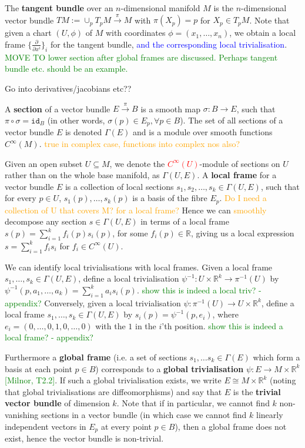 \documentclass[a4paper]{article}
\theoremstyle{definition} \newtheorem*{definition}{Definition}
\theoremstyle{definition} \newtheorem*{definitions}{Definitions}
\theoremstyle{plain} \newtheorem{theorem}{Theorem}[section]
\theoremstyle{plain} \newtheorem{proposition}[theorem]{Proposition}
\theoremstyle{plain} \newtheorem{corollary}[theorem]{Corollary}
\theoremstyle{plain} \newtheorem{lemma}[theorem]{Lemma}
\theoremstyle{plain} \newtheorem{example}[theorem]{Example}
\newcommand{\checkCorrect}[1]{\textcolor{red}{#1}}
\newcommand{\understandBetter}[1]{\textcolor{orange}{#1}}
\newcommand{\question}[1]{\textcolor{orange}{#1}}
\newcommand{\explainFurther}[1]{\textcolor{blue}{#1}}
\newcommand{\finish}[1]{\textcolor{green}{#1}}
\newcommand{\defn}[1]{\textbf{#1}}
\newcommand{\realnos}{\mathbb{R}}
\newcommand{\id}{\mathtt{id}}
\begin{document}
The \defn{tangent bundle} over an $n$-dimensional manifold $M$ is the $n$-dimensional vector bundle $TM:=\cup_p T_p M\xrightarrow{\pi} M$ with $\pi(X_p)=p$ for $X_p\in T_p M$. Note that given a chart $(U, \phi)$ of $M$ with coordinates $\phi =(x_1, \ldots, x_n)$, we obtain a local frame $\{\frac{\partial}{\partial{x^i}}\}_i$ for the tangent bundle, \explainFurther{and the corresponding local trivialisation}. \finish{MOVE TO lower section after global frames are discussed. Perhaps tangent bundle etc. should be an example.}



Go into derivatives/jacobians etc??

A \defn{section} of a vector bundle $E\xrightarrow{\pi} B$ is a smooth map $\sigma:B\rightarrow E$, such that $\pi \circ \sigma=\id_B$ (in other words, $\sigma(p)\in E_p, \forall p\in B$). The set of all sections of a vector bundle $E$ is denoted $\Gamma (E)$ and is a module over smooth functions $C^\infty(M)$. \question{true in complex case, functions into complex nos also?}

Given an open subset $U\subseteq M$, we denote the \checkCorrect{$C^\infty (U)$}-module of sections on $U$ rather than on the whole base manifold, as $\Gamma (U, E)$. A \defn{local frame} for a vector bundle $E$ is a collection of local sections $s_1, s_2, \ldots, s_k\in \Gamma (U, E)$, such that for every $p\in U$, $s_1(p),\ldots, s_k(p)$ is a basis of the fibre $E_p$. \question{Do I need a collection of U that covers M? for a local frame?} Hence we can \understandBetter{smoothly} decompose any section $s\in \Gamma(U, E)$ in terms of a local frame $s(p)=\sum_{i=1}^k f_i(p)s_i(p)$, for some $f_i(p)\in \realnos$, giving us a local expression $s=\sum_{i=1}^k f_i s_i$ for $f_i\in C^\infty(U)$. 

We can identify local trivialisations with local frames. Given a local frame $s_1, \ldots, s_k\in \Gamma(U, E)$, define a local trivialisation $\psi^{-1}:U\times \realnos^k \to \pi^{-1}(U)$ by
$\psi^{-1}(p, a_1, \ldots, a_k) = \sum_{i=1}^k a_is_i(p)$. \finish{show this is indeed a local triv? - appendix?} Conversely, given a local trivialisation $\psi:\pi^{-1}(U) \to U\times \realnos^k$, define a local frame $s_1,\ldots , s_k\in \Gamma(U, E)$ by $s_i(p)=\psi^{-1} (p, e_i)$, where $e_i = (0, \ldots, 0, 1, 0, \ldots, 0)$ with the $1$ in the $i$'th position. \finish{show this is indeed a local frame? - appendix?}

Furthermore a \defn{global frame} (i.e. a set of sections $s_1, \ldots s_k\in \Gamma(E)$ which form a basis at each point $p\in B$) corresponds to a \defn{global trivialisation} $\psi:E \to M\times \realnos^k$ \finish{[Milnor, T2.2]}. If such a global trivialisation exists, we write $E\cong M\times \realnos^k$ (noting that global trivialisations are diffeomorphisms) and say that $E$ is the \defn{trivial vector bundle} of dimension $k$. 
Note that if in particular, we cannot find $k$ non-vanishing sections in a vector bundle (in which case we cannot find $k$ linearly independent vectors in $E_p$ at every point $p\in B$), then a global frame does not exist, hence the vector bundle is non-trivial.  
\end{document}
